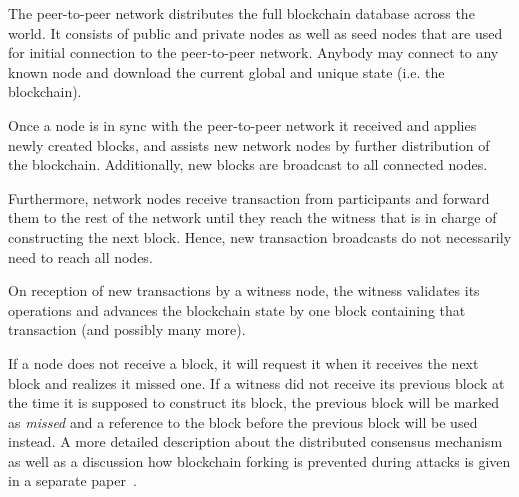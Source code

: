The peer-to-peer network distributes the full blockchain database across the
world. It consists of public and private nodes as well as seed nodes that are
used for initial connection to the peer-to-peer network. Anybody may connect to
any known node and download the current global and unique state (i.e. the
blockchain).

Once a node is in sync with the peer-to-peer network it received and applies
newly created blocks, and assists new network nodes by further distribution of
the blockchain. Additionally, new blocks are broadcast to all connected nodes.

Furthermore, network nodes receive transaction from participants and forward
them to the rest of the network until they reach the witness that is in charge
of constructing the next block. Hence, new transaction broadcasts do not
necessarily need to reach all nodes.

On reception of new transactions by a witness node, the witness validates its
operations and advances the blockchain state by one block containing that
transaction (and possibly many more).

If a node does not receive a block, it will request it when it receives the
next block and realizes it missed one. If a witness did not receive its
previous block at the time it is supposed to construct its block, the previous
block will be marked as \emph{missed} and a reference to the block before the
previous block will be used instead. A more detailed description about the
distributed consensus mechanism as well as a discussion how blockchain forking
is prevented during attacks is given in a separate paper~\cite{}. %
